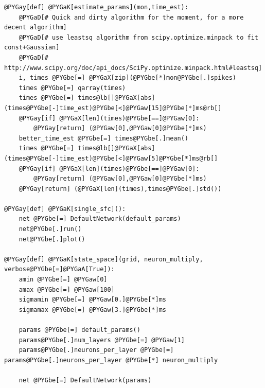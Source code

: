 \documentclass[letterpaper,10pt]{manual}
\begin{document}
\begin{Verbatim}[commandchars=@\[\]]
@PYGay[def] @PYGaK[estimate_params](mon,time_est):
    @PYGaD[# Quick and dirty algorithm for the moment, for a more decent algorithm]
    @PYGaD[# use leastsq algorithm from scipy.optimize.minpack to fit const+Gaussian]
    @PYGaD[# http://www.scipy.org/doc/api_docs/SciPy.optimize.minpack.html#leastsq]
    i, times @PYGbe[=] @PYGaX[zip](@PYGbe[*]mon@PYGbe[.]spikes)
    times @PYGbe[=] qarray(times)
    times @PYGbe[=] times@lb[]@PYGaX[abs](times@PYGbe[-]time_est)@PYGbe[<]@PYGaw[15]@PYGbe[*]ms@rb[]
    @PYGay[if] @PYGaX[len](times)@PYGbe[==]@PYGaw[0]:
        @PYGay[return] (@PYGaw[0],@PYGaw[0]@PYGbe[*]ms)
    better_time_est @PYGbe[=] times@PYGbe[.]mean()
    times @PYGbe[=] times@lb[]@PYGaX[abs](times@PYGbe[-]time_est)@PYGbe[<]@PYGaw[5]@PYGbe[*]ms@rb[]
    @PYGay[if] @PYGaX[len](times)@PYGbe[==]@PYGaw[0]:
        @PYGay[return] (@PYGaw[0],@PYGaw[0]@PYGbe[*]ms)
    @PYGay[return] (@PYGaX[len](times),times@PYGbe[.]std())

@PYGay[def] @PYGaK[single_sfc]():
    net @PYGbe[=] DefaultNetwork(default_params)
    net@PYGbe[.]run()
    net@PYGbe[.]plot()

@PYGay[def] @PYGaK[state_space](grid, neuron_multiply, verbose@PYGbe[=]@PYGaA[True]):
    amin @PYGbe[=] @PYGaw[0]
    amax @PYGbe[=] @PYGaw[100]
    sigmamin @PYGbe[=] @PYGaw[0.]@PYGbe[*]ms
    sigmamax @PYGbe[=] @PYGaw[3.]@PYGbe[*]ms

    params @PYGbe[=] default_params()
    params@PYGbe[.]num_layers @PYGbe[=] @PYGaw[1]
    params@PYGbe[.]neurons_per_layer @PYGbe[=] params@PYGbe[.]neurons_per_layer @PYGbe[*] neuron_multiply

    net @PYGbe[=] DefaultNetwork(params)


\end{Verbatim}
\end{document}

